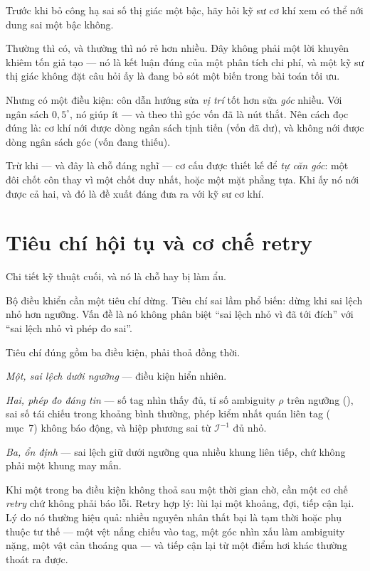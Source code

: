 \documentclass[../../marker.tex]{subfiles}
\begin{document}
\begin{cannho}
Trước khi bỏ công hạ sai số thị giác một bậc, hãy hỏi kỹ sư cơ khí xem có thể nới dung sai một bậc không.

Thường thì có, và thường thì nó rẻ hơn nhiều. Đây không phải một lời khuyên khiêm tốn giả tạo --- nó là kết luận đúng của một phân tích chi phí, và một kỹ sư thị giác không đặt câu hỏi ấy là đang bỏ sót một biến trong bài toán tối ưu.

Nhưng có một điều kiện: côn dẫn hướng sửa \emph{vị trí} tốt hơn sửa \emph{góc} nhiều. Với ngân sách \(0{,}5^\circ\), nó giúp ít --- và theo  thì góc vốn đã là nút thắt. Nên cách đọc đúng là: cơ khí nới được dòng ngân sách tịnh tiến (vốn đã dư), và không nới được dòng ngân sách góc (vốn đang thiếu).

Trừ khi --- và đây là chỗ đáng nghĩ --- cơ cấu được thiết kế để \emph{tự căn góc}: một đôi chốt côn thay vì một chốt duy nhất, hoặc một mặt phẳng tựa. Khi ấy nó nới được cả hai, và đó là đề xuất đáng đưa ra với kỹ sư cơ khí.
\end{cannho}

\section{Tiêu chí hội tụ và cơ chế retry}

Chi tiết kỹ thuật cuối, và nó là chỗ hay bị làm ẩu.

Bộ điều khiển cần một tiêu chí dừng. Tiêu chí sai lầm phổ biến: dừng khi sai lệch nhỏ hơn ngưỡng. Vấn đề là nó không phân biệt ``sai lệch nhỏ vì đã tới đích'' với ``sai lệch nhỏ vì phép đo sai''.

Tiêu chí đúng gồm ba điều kiện, phải thoả đồng thời.

\emph{Một, sai lệch dưới ngưỡng} --- điều kiện hiển nhiên.

\emph{Hai, phép đo đáng tin} --- số tag nhìn thấy đủ, tỉ số ambiguity \(\rho\) trên ngưỡng (), sai số tái chiếu trong khoảng bình thường, phép kiểm nhất quán liên tag ( mục~7) không báo động, và hiệp phương sai từ \(\mathcal{I}^{-1}\) đủ nhỏ.

\emph{Ba, ổn định} --- sai lệch giữ dưới ngưỡng qua nhiều khung liên tiếp, chứ không phải một khung may mắn.

Khi một trong ba điều kiện không thoả sau một thời gian chờ, cần một cơ chế \emph{retry} chứ không phải báo lỗi. Retry hợp lý: lùi lại một khoảng, đợi, tiếp cận lại. Lý do nó thường hiệu quả: nhiều nguyên nhân thất bại là tạm thời hoặc phụ thuộc tư thế --- một vệt nắng chiếu vào tag, một góc nhìn xấu làm ambiguity nặng, một vật cản thoáng qua --- và tiếp cận lại từ một điểm hơi khác thường thoát ra được.
\end{document}
